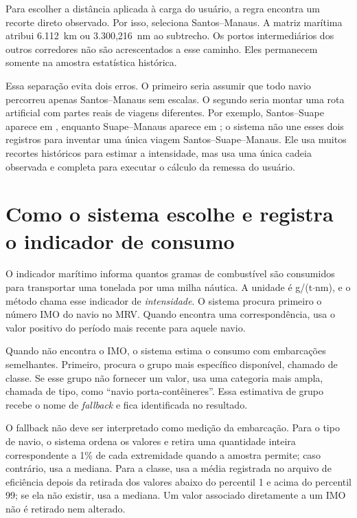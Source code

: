 Para escolher a distância aplicada à carga do usuário, a regra encontra um recorte direto observado. Por isso, seleciona Santos--Manaus. A matriz marítima atribui 6.112~km ou 3.300,216~nm ao subtrecho. Os portos intermediários dos outros corredores não são acrescentados a esse caminho. Eles permanecem somente na amostra estatística histórica.

Essa separação evita dois erros. O primeiro seria assumir que todo navio percorreu apenas Santos--Manaus sem escalas. O segundo seria montar uma rota artificial com partes reais de viagens diferentes. Por exemplo, Santos--Suape aparece em , enquanto Suape--Manaus aparece em ; o sistema não une esses dois registros para inventar uma única viagem Santos--Suape--Manaus. Ele usa muitos recortes históricos para estimar a intensidade, mas usa uma única cadeia observada e completa para executar o cálculo da remessa do usuário.

\section{Como o sistema escolhe e registra o indicador de consumo}
\label{sec:robustez-maritima-discussao}

O indicador marítimo informa quantos gramas de combustível são consumidos para transportar uma tonelada por uma milha náutica. A unidade é g/(t$\cdot$nm), e o método chama esse indicador de \emph{intensidade}. O sistema procura primeiro o número IMO do navio no MRV. Quando encontra uma correspondência, usa o valor positivo do período mais recente para aquele navio.

Quando não encontra o IMO, o sistema estima o consumo com embarcações semelhantes. Primeiro, procura o grupo mais específico disponível, chamado de classe. Se esse grupo não fornecer um valor, usa uma categoria mais ampla, chamada de tipo, como ``navio porta-contêineres''. Essa estimativa de grupo recebe o nome de \emph{fallback} e fica identificada no resultado.

O fallback não deve ser interpretado como medição da embarcação. Para o tipo de navio, o sistema ordena os valores e retira uma quantidade inteira correspondente a 1\% de cada extremidade quando a amostra permite; caso contrário, usa a mediana. Para a classe, usa a média registrada no arquivo de eficiência depois da retirada dos valores abaixo do percentil 1 e acima do percentil 99; se ela não existir, usa a mediana. Um valor associado diretamente a um IMO não é retirado nem alterado.

